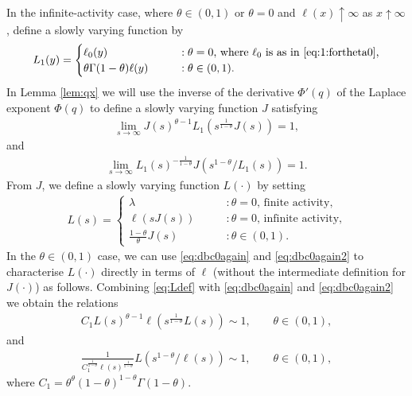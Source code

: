 \documentclass[a4,12pt]{amsart}
\numberwithin{equation}{section}
\begin{document}
In the infinite-activity case, where $\theta \in (0,1)$ or $\theta = 0$ and $\ell(x) \uparrow \infty$ as $x \uparrow \infty$, define a slowly varying function by 
 \begin{align} \label{eq:Ldef}
L_1(y) = 
\begin{cases}
 \ell_0(y) \qquad &:\text{$\theta = 0$,  where $\ell_0$ is as in \eqref{eq:1:fortheta0},}\\
 \theta \Gamma(1-\theta)\ell(y) \qquad &:\text{$\theta \in (0,1)$}.\\
\end{cases} 
\end{align}
In Lemma \ref{lem:qx} we will use the inverse of the derivative $\Phi'(q)$ of the Laplace exponent $\Phi(q)$ to define a slowly varying function $J$ satisfying 
    \begin{align} \label{eq:dbc0again}
\lim_{s \to \infty} J(s)^{\theta - 1} L_1 \left( s^{\frac{1}{1-\theta}} J(s) \right) = 1,
\end{align}
and 
    \begin{align} \label{eq:dbc0again2}
\lim_{s \to \infty} L_1(s)^{ - \frac{1}{1-\theta}}J(s^{1-\theta}/L_1(s)) = 1. 
\end{align}
From $J$, we define a slowly varying function $L(\cdot)$ by setting 
 \begin{align} \label{eq:Lpuredef}
L(s) = 
\begin{cases}
\lambda \qquad &:\text{$\theta = 0$, finite activity,}\\
\ell(sJ(s)) \qquad &:\text{$\theta = 0$, infinite activity,}\\
\frac{1-\theta}{\theta}J(s) \qquad &:\text{$\theta \in (0,1)$}.
\end{cases} 
\end{align}
In the $\theta \in (0,1)$ case, we can use \eqref{eq:dbc0again} and \eqref{eq:dbc0again2} to characterise $L(\cdot)$ directly in terms of $\ell$ (without the intermediate definition for $J(\cdot)$) as follows. Combining \eqref{eq:Ldef}  with \eqref{eq:dbc0again} and \eqref{eq:dbc0again2} we obtain the relations
\begin{align*}
C_1 L(s)^{\theta-1} \ell \left( s^{\frac{1}{1-\theta}} L(s) \right) \sim 1, \qquad \theta \in (0,1),
\end{align*}
and
\begin{align} \label{eq:beak}
\frac{1}{C_1^{\frac{1}{1-\theta}} \ell(s)^{\frac{1}{1-\theta}}} L \left( s^{1-\theta}/\ell(s) \right) \sim 1, \qquad \theta \in (0,1),
\end{align}
where $C_1 = \theta^\theta (1-\theta)^{1-\theta}\Gamma(1-\theta)$. 
\end{document}

